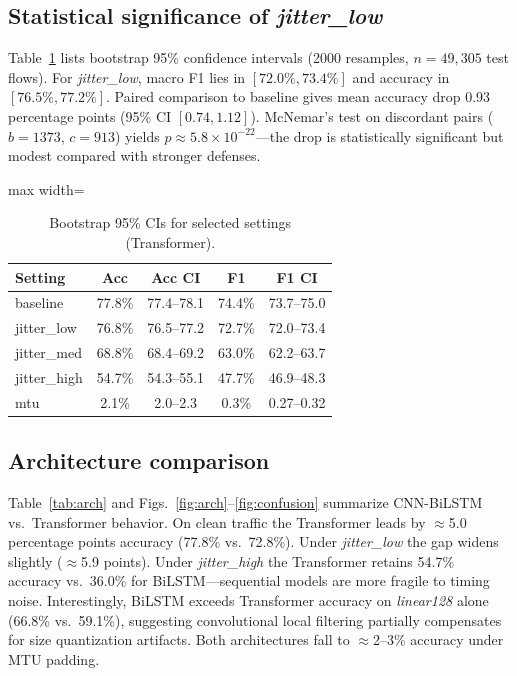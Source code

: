 \subsection{Statistical significance of \emph{jitter\_low}}

Table~\ref{tab:bootstrap} lists bootstrap 95\% confidence intervals (2000
resamples, $n=49{,}305$ test flows). For \emph{jitter\_low}, macro F1 lies in
$[72.0\%, 73.4\%]$ and accuracy in $[76.5\%, 77.2\%]$. Paired comparison to
baseline gives mean accuracy drop 0.93 percentage points (95\% CI $[0.74, 1.12]$).
McNemar's test on discordant pairs ($b{=}1373$, $c{=}913$) yields
$p \approx 5.8\times10^{-22}$---the drop is statistically significant but modest
compared with stronger defenses.

\begin{table}[t]
  \centering
  \caption{Bootstrap 95\% CIs for selected settings (Transformer).}
  \label{tab:bootstrap}
  \footnotesize
  \setlength{\tabcolsep}{3pt}
  \begin{adjustbox}{max width=\columnwidth}
  \begin{tabular}{@{}lcccc@{}}
    \toprule
    Setting & Acc & Acc CI & F1 & F1 CI \\
    \midrule
    baseline & 77.8\% & 77.4--78.1 & 74.4\% & 73.7--75.0 \\
    jitter\_low & 76.8\% & 76.5--77.2 & 72.7\% & 72.0--73.4 \\
    jitter\_med & 68.8\% & 68.4--69.2 & 63.0\% & 62.2--63.7 \\
    jitter\_high & 54.7\% & 54.3--55.1 & 47.7\% & 46.9--48.3 \\
    mtu & 2.1\% & 2.0--2.3 & 0.3\% & 0.27--0.32 \\
    \bottomrule
  \end{tabular}
  \end{adjustbox}
\end{table}

\subsection{Architecture comparison}

Table~\ref{tab:arch} and Figs.~\ref{fig:arch}--\ref{fig:confusion} summarize CNN-BiLSTM vs.\
Transformer behavior. On clean traffic the Transformer leads by $\approx$5.0
percentage points accuracy (77.8\% vs.\ 72.8\%). Under \emph{jitter\_low} the gap
widens slightly ($\approx$5.9 points). Under \emph{jitter\_high} the Transformer
retains 54.7\% accuracy vs.\ 36.0\% for BiLSTM---sequential models are more fragile
to timing noise. Interestingly, BiLSTM exceeds Transformer accuracy on
\emph{linear128} alone (66.8\% vs.\ 59.1\%), suggesting convolutional local filtering
partially compensates for size quantization artifacts. Both architectures fall to
$\approx$2--3\% accuracy under MTU padding.

